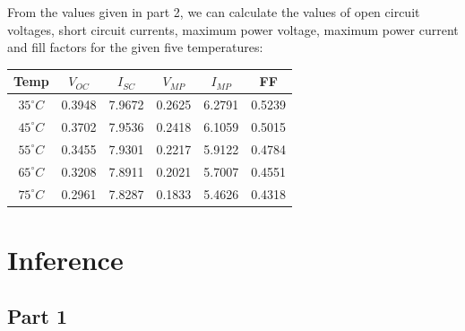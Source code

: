 \documentclass[12pt]{article}
\begin{document}
From the values given in part 2, we can calculate the values of open circuit voltages, short circuit currents, maximum power voltage, maximum power current and fill factors for the given five temperatures:
\begin{center}
 \begin{tabular}{|| c | c | c | c | c |c ||} 
 \hline
 \hline
 Temp & \(V_{OC}\) & \(I_{SC}\) & \(V_{MP}\) & \(I_{MP}\) & FF \\[0.25ex] 
 \hline\hline
 \(35^{\circ}C\) & 0.3948 & 7.9672 & 0.2625 & 6.2791 & 0.5239 \\
 \(45^{\circ}C\) & 0.3702 & 7.9536 & 0.2418 & 6.1059 & 0.5015 \\
 \(55^{\circ}C\) & 0.3455 & 7.9301 & 0.2217 & 5.9122 & 0.4784 \\
 \(65^{\circ}C\) & 0.3208 & 7.8911 & 0.2021 & 5.7007 & 0.4551 \\
 \(75^{\circ}C\) & 0.2961 & 7.8287 & 0.1833 & 5.4626 & 0.4318 \\
 \hline 

\end{tabular}
\end{center}

\section{Inference}

\subsection{Part 1}
\end{document}
